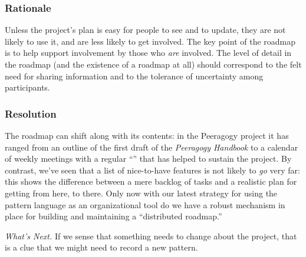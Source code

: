 \subsubsection*{Rationale} Unless the project's plan is easy for people to see and to update, they are not likely to use it, and are less likely to get involved.  The key point of the roadmap is to help support involvement by those who \emph{are} involved.   The level of detail in the roadmap (and the existence of a roadmap at all) should correspond to the felt need for sharing information and to the tolerance of uncertainty among participants.

\subsubsection*{Resolution}
The roadmap can shift along with its contents: in the Peeragogy project it has ranged from an outline of the first draft of the \emph{Peeragogy Handbook} to a calendar of weekly meetings with a regular ``'' that has helped to sustain the project.  By contrast, we've seen that a list of nice-to-have features is not likely to \emph{go} very far: this shows the difference between a mere backlog of tasks and a realistic plan for getting from here, to there.  Only now with our latest strategy for using the pattern language as an organizational tool do we have a robust mechanism in place for building and maintaining a ``distributed roadmap.''

\begin{framed}
\emph{What's Next.}
If we sense that something needs to change about the project, that is a clue that we might need to record a new pattern.
\end{framed}

\endgroup
    
    
    
    
    
    
    
    
    